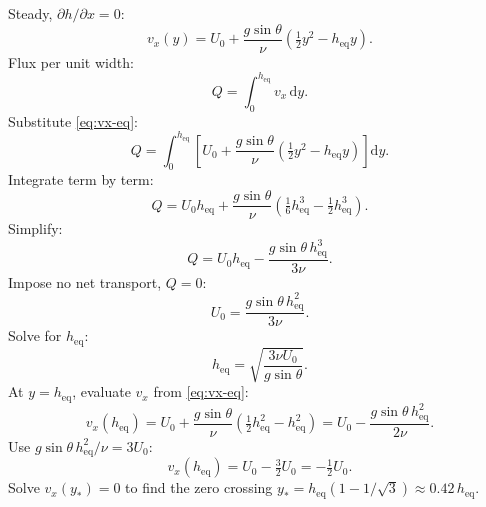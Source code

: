 \documentclass[11pt]{article}
\newcommand{\de}{\mathrm{d}}
\begin{document}
Steady, $\partial h/\partial x = 0$:
\begin{equation}
v_x(y) = U_0 + \frac{g\sin\theta}{\nu}\!\left(\tfrac12 y^2 - h_{\text{eq}} y\right).
\label{eq:vx-eq}
\end{equation}
Flux per unit width:
\[ Q = \int_0^{h_{\text{eq}}}\!\!v_x\,\de y. \]
Substitute \eqref{eq:vx-eq}:
\[ Q = \int_0^{h_{\text{eq}}}\!\!\left[U_0 + \frac{g\sin\theta}{\nu}\!\left(\tfrac12 y^2 - h_{\text{eq}} y\right)\right]\de y. \]
Integrate term by term:
\[ Q = U_0 h_{\text{eq}} + \frac{g\sin\theta}{\nu}\!\left(\tfrac16 h_{\text{eq}}^3 - \tfrac12 h_{\text{eq}}^3\right). \]
Simplify:
\[ Q = U_0 h_{\text{eq}} - \frac{g\sin\theta\,h_{\text{eq}}^3}{3\nu}. \]
Impose no net transport, $Q=0$:
\[ U_0 = \frac{g\sin\theta\,h_{\text{eq}}^2}{3\nu}. \]
Solve for $h_{\text{eq}}$:
\begin{equation}
\boxed{\;h_{\text{eq}} = \sqrt{\frac{3\nu U_0}{g\sin\theta}}.\;}
\label{eq:heq}
\end{equation}
At $y=h_{\text{eq}}$, evaluate $v_x$ from \eqref{eq:vx-eq}:
\[ v_x(h_{\text{eq}}) = U_0 + \frac{g\sin\theta}{\nu}\!\left(\tfrac12 h_{\text{eq}}^2 - h_{\text{eq}}^2\right) = U_0 - \frac{g\sin\theta\,h_{\text{eq}}^2}{2\nu}. \]
Use $g\sin\theta\,h_{\text{eq}}^2/\nu = 3U_0$:
\[ v_x(h_{\text{eq}}) = U_0 - \tfrac32 U_0 = -\tfrac12 U_0. \]
Solve $v_x(y_*)=0$ to find the zero crossing $y_* = h_{\text{eq}}(1-1/\sqrt 3)\approx 0.42\,h_{\text{eq}}$.
\begin{center}
\end{center}
\end{document}
